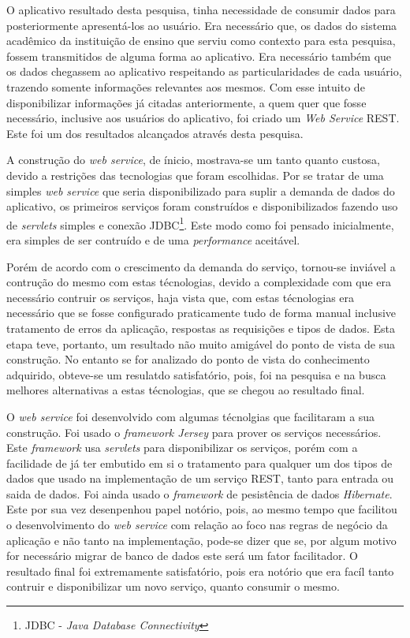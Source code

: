 	\par O aplicativo resultado desta pesquisa, tinha necessidade de consumir
dados para posteriormente apresentá-los ao usuário. Era necessário que, os
dados do sistema acadêmico da instituição de ensino que serviu como contexto
para esta pesquisa, fossem transmitidos de alguma forma ao aplicativo. Era
necessário também que os dados chegassem ao aplicativo respeitando as
particularidades de cada usuário, trazendo somente informações relevantes aos
mesmos. Com esse intuito de disponibilizar informações já citadas
anteriormente, a quem quer que fosse necessário, inclusive aos usuários do
aplicativo, foi criado um \textit{Web Service} REST. Este foi um dos resultados
alcançados através desta pesquisa.
	
	\par A construção do \textit{web service}, de ínicio, mostrava-se um tanto
quanto custosa, devido a restrições das tecnologias que foram escolhidas. Por se
tratar de uma simples \textit{web service} que seria disponibilizado para suplir
a demanda de dados do aplicativo, os primeiros serviços foram construídos e
disponibilizados fazendo uso de \textit{servlets} simples e conexão
JDBC\footnote{JDBC - \textit{Java Database Connectivity}}. Este modo como foi
pensado inicialmente, era simples de ser contruído e de uma
\textit{performance} aceitável. 

	\par Porém de acordo com o crescimento da demanda do serviço, tornou-se
inviável a contrução do mesmo com estas técnologias, devido a complexidade com
que era necessário contruir os serviços, haja vista que, com estas técnologias
era necessário que se fosse configurado praticamente tudo de forma manual
inclusive tratamento de erros da aplicação, respostas as requisições e tipos de
dados. Esta etapa teve, portanto, um resultado não muito amigável do ponto de
vista de sua construção. No entanto se for analizado do ponto de vista do
conhecimento adquirido, obteve-se um resulatdo satisfatório, pois, foi na
pesquisa e na busca melhores alternativas a estas técnologias, que se chegou ao
resultado final.

	\par O \textit{web service} foi desenvolvido com algumas técnolgias que
facilitaram a sua construção. Foi usado o \textit{framework Jersey} para prover
os serviços necessários. Este \textit{framework} usa \textit{servlets} para
disponibilizar os serviços, porém com a facilidade de já ter embutido em si o
tratamento para qualquer um dos tipos de dados que usado na implementação de um
serviço REST, tanto para entrada ou saida de dados. Foi ainda usado o
\textit{framework} de pesistência de dados \textit{Hibernate}. Este por sua vez
desenpenhou papel notório, pois, ao mesmo tempo que facilitou o desenvolvimento
do \textit{web service} com relação ao foco nas regras de negócio da aplicação e
não tanto na implementação, pode-se dizer que se, por algum motivo for
necessário migrar de banco de dados este será um fator facilitador. O resultado
final foi extremamente satisfatório, pois era notório que era facíl tanto
contruir e disponibilizar um novo serviço, quanto consumir o mesmo.

